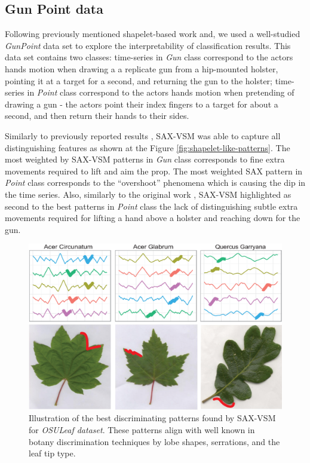 \documentclass{llncs}
\newcommand{\myfigureshrinker}{\vspace{-1cm}}
\begin{document}
\subsection{Gun Point data}
Following previously mentioned shapelet-based work \cite{shapelet} and\cite{bagnal}, 
we used a well-studied \textit{GunPoint} data set \cite{gun} to explore the 
interpretability of classification results. This data set contains two classes: 
time-series in \textit{Gun} class correspond to the actors hands motion when drawing a 
a replicate gun from a hip-mounted holster, pointing it at a target for a second,
and returning the gun to the holster; 
time-series in \textit{Point} class correspond to the actors hands motion when pretending
of drawing a gun - the actors point their index fingers to a target for about a second, 
and then return their hands to their sides. 

Similarly to previously reported results \cite{shapelet} \cite{bagnal}, 
SAX-VSM was able to capture all distinguishing features as shown at the 
Figure \ref{fig:shapelet-like-patterns}. The most weighted by SAX-VSM patterns in 
\textit{Gun} class corresponds to fine extra movements required to lift and aim the prop. 
The most weighted SAX pattern in \textit{Point} class corresponds to the ``overshoot''
phenomena which is causing the dip in the time series. 
Also, similarly to the original work \cite{gun}, SAX-VSM highlighted as second to the best
patterns in \textit{Point} class the lack of distinguishing subtle extra movements required
for lifting a hand above a holster and reaching down for the gun.

\begin{figure}[t]
   \myfigureshrinker
   \centering
   \includegraphics[width=115mm]{figures/AcerCircunatum.eps}
   \caption{Illustration of the best discriminating patterns found by SAX-VSM for
\textit{OSULeaf dataset}. These patterns align with well known in botany discrimination techniques
by lobe shapes, serrations, and the leaf tip type.}
   \label{fig:shapelet-acer-patterns}
\end{figure}
\end{document}

